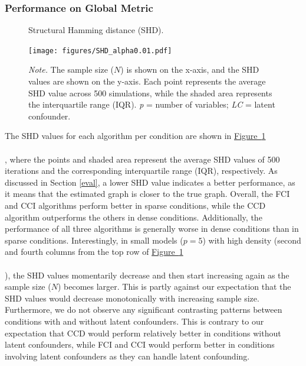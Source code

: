\documentclass[twoside, 11pt]{article}
\newcommand*{\figref}[2][]{%
  \hyperref[{fig:#2}]{%
    Figure~\ref*{fig:#2}%
    \ifx\\#1\\%
    \else
      #1%
    \fi
  }%
}
\begin{document}
\subsubsection{Performance on Global Metric} \label{overallperformance}


\begin{figure}[!b]
\vspace{3mm}
    \centering
        \caption{Structural Hamming distance (SHD).}
        \vspace{1mm}
        \texttt{[image: figures/SHD\_alpha0.01.pdf]}
        \vspace*{-4mm}
        \caption*{\small{\textit{Note.} The sample size ($N$) is shown on the x-axis, and the SHD values are shown on the y-axis. Each point represents the average SHD value across 500 simulations, while the shaded area represents the interquartile range (IQR). \textit{p} = number of variables; \textit{LC} = latent confounder.}}
    \label{fig:13}
\end{figure}

The SHD values for each algorithm per condition are shown in \figref[]{13}, where the points and shaded area represent the average SHD values of 500 iterations and the corresponding interquartile range (IQR), respectively. As discussed in Section \ref{eval}, a lower SHD value indicates a better performance, as it means that the estimated graph is closer to the true graph. Overall, the FCI and CCI algorithms perform better in sparse conditions, while the CCD algorithm outperforms the others in dense conditions.
Additionally, the performance of all three algorithms is generally worse in dense conditions than in sparse conditions.
Interestingly, in small models ($p=5$) with high density (second and fourth columns from the top row of \figref[]{13}), the SHD values momentarily decrease and then start increasing again as the sample size ($N$) becomes larger. This is partly against our expectation that the SHD values would decrease monotonically with increasing sample size. Furthermore, we do not observe any significant contrasting patterns between conditions with and without latent confounders. This is contrary to our expectation that CCD would perform relatively better in conditions without latent confounders, while FCI and CCI would perform better in conditions involving latent confounders as they can handle latent confounding.
\end{document}
